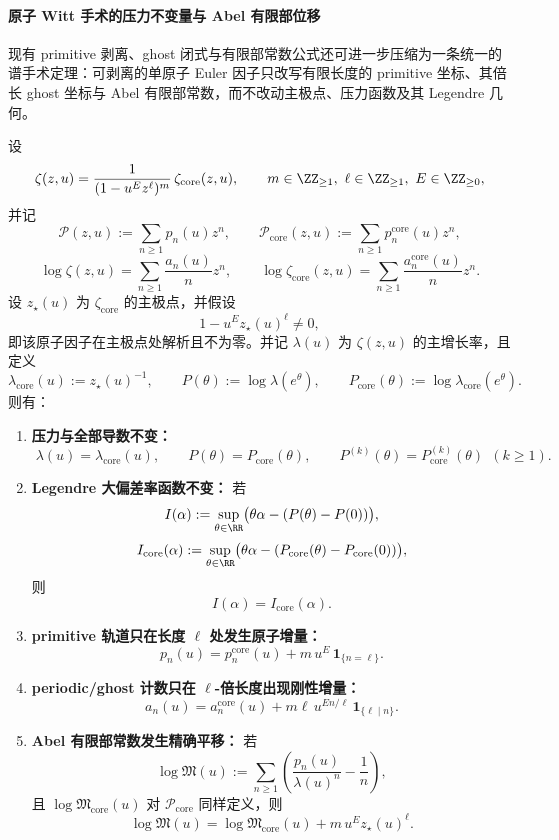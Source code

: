\paragraph{原子 Witt 手术的压力不变量与 Abel 有限部位移}
现有 primitive 剥离、ghost 闭式与有限部常数公式还可进一步压缩为一条统一的谱手术定理：可剥离的单原子 Euler 因子只改写有限长度的 primitive 坐标、其倍长 ghost 坐标与 Abel 有限部常数，而不改动主极点、压力函数及其 Legendre 几何。

\begin{theorem}\label{thm:xi-atomic-witt-surgery-pressure-ldp-abel-invariance}
设
\[
\zeta(z,u)=\frac{1}{(1-u^Ez^\ell)^m}\,\zeta_{\mathrm{core}}(z,u),
\qquad
m\in\ZZ_{\ge 1},\ \ell\in\ZZ_{\ge 1},\ E\in\ZZ_{\ge 0},
\]
并记
\[
\mathcal P(z,u):=\sum_{n\ge 1}p_n(u)z^n,
\qquad
\mathcal P_{\mathrm{core}}(z,u):=\sum_{n\ge 1}p_n^{\mathrm{core}}(u)z^n,
\]
\[
\log\zeta(z,u)=\sum_{n\ge 1}\frac{a_n(u)}{n}z^n,
\qquad
\log\zeta_{\mathrm{core}}(z,u)=\sum_{n\ge 1}\frac{a_n^{\mathrm{core}}(u)}{n}z^n.
\]
设 \(z_\star(u)\) 为 \(\zeta_{\mathrm{core}}\) 的主极点，并假设
\[
1-u^Ez_\star(u)^\ell\neq 0,
\]
即该原子因子在主极点处解析且不为零。并记 \(\lambda(u)\) 为 \(\zeta(z,u)\) 的主增长率，且定义
\[
\lambda_{\mathrm{core}}(u):=z_\star(u)^{-1},
\qquad
P(\theta):=\log\lambda(e^\theta),
\qquad
P_{\mathrm{core}}(\theta):=\log\lambda_{\mathrm{core}}(e^\theta).
\]
则有：
\begin{enumerate}
  \item \textbf{压力与全部导数不变：}
  \[
  \boxed{\;
  \lambda(u)=\lambda_{\mathrm{core}}(u),\qquad
  P(\theta)=P_{\mathrm{core}}(\theta),\qquad
  P^{(k)}(\theta)=P_{\mathrm{core}}^{(k)}(\theta)\ \ (k\ge 1).\;}
  \]
  \item \textbf{Legendre 大偏差率函数不变：}
  若
  \[
  I(\alpha):=\sup_{\theta\in\RR}\bigl(\theta\alpha-(P(\theta)-P(0))\bigr),
  \]
  \[
  I_{\mathrm{core}}(\alpha):=\sup_{\theta\in\RR}\bigl(\theta\alpha-(P_{\mathrm{core}}(\theta)-P_{\mathrm{core}}(0))\bigr),
  \]
  则
  \[
  \boxed{\;I(\alpha)=I_{\mathrm{core}}(\alpha).\;}
  \]
  \item \textbf{primitive 轨道只在长度 \(\ell\) 处发生原子增量：}
  \[
  \boxed{\;
  p_n(u)=p_n^{\mathrm{core}}(u)+m\,u^E\,\mathbf 1_{\{n=\ell\}}.\;}
  \]
  \item \textbf{periodic/ghost 计数只在 \(\ell\)-倍长度出现刚性增量：}
  \[
  \boxed{\;
  a_n(u)=a_n^{\mathrm{core}}(u)+m\ell\,u^{En/\ell}\,\mathbf 1_{\{\ell\mid n\}}.\;}
  \]
  \item \textbf{Abel 有限部常数发生精确平移：}
  若
  \[
  \log\mathfrak M(u):=\sum_{n\ge 1}\left(\frac{p_n(u)}{\lambda(u)^n}-\frac1n\right),
  \]
  且 \(\log\mathfrak M_{\mathrm{core}}(u)\) 对 \(\mathcal P_{\mathrm{core}}\) 同样定义，则
  \[
  \boxed{\;
  \log\mathfrak M(u)=\log\mathfrak M_{\mathrm{core}}(u)+m\,u^Ez_\star(u)^\ell.\;}
  \]
\end{enumerate}
\end{theorem}
